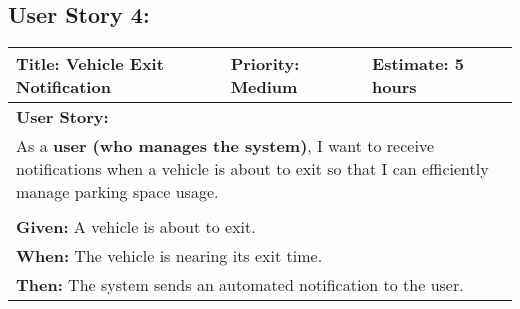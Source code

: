 \newpage

\subsection{User Story 4:}
\begin{table}[H]
    \centering
    \begin{tabular}{|p{}|p{}|p{}|}
        \hline
        \rowcolor{lightblue}
        \textbf{Title: Vehicle Exit Notification} & \textbf{Priority: Medium} & \textbf{Estimate: 5 hours} \\
        \hline
        \multicolumn{3}{|l|}{\textbf{User Story:}} \\
        \multicolumn{3}{|p{15cm}|}{As a \textbf{user (who manages the system)}, I want to receive notifications when a vehicle is about to exit so that I can efficiently manage parking space usage.} \\
        \hline
        \rowcolor{lightblue}
        \multicolumn{3}{|c|}{\textbf{Acceptance Criteria:}} \\
        \hline
        \multicolumn{3}{|l|}{\textbf{Given:} A vehicle is about to exit.} \\
        \multicolumn{3}{|l|}{\textbf{When:} The vehicle is nearing its exit time.} \\
        \multicolumn{3}{|l|}{\textbf{Then:} The system sends an automated notification to the user.} \\
        \hline
    \end{tabular}
\end{table}

